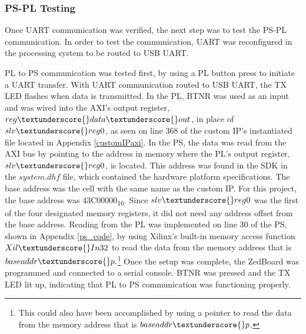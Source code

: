 \subsubsection{PS-PL Testing}
Once UART communication was verified, the next step was to test the PS-PL communication. In order to test the communication, UART was reconfigured in the processing system to be routed to USB UART.
\par
PL to PS communication was tested first, by using a PL button press to initiate a UART transfer. With UART communication routed to USB UART, the TX LED flashes when data is transmitted. In the PL, BTNR was used as an input and was wired into the AXI's output register, $reg\textunderscore{}data\textunderscore{}out$, in place of $slv\textunderscore{}reg0$, as seen on line 368 of the custom IP's instantiated file located in Appendix \ref{customIPaxi}. In the PS, the data was read from the AXI bus by pointing to the address in memory where the PL's output register, $slv\textunderscore{}reg0$, is located. This address was found in the SDK in the $system.dhf$ file, which contained the hardware platform specifications. The base address was the cell with the same name as the custom IP. For this project, the base address was 43C00000\textsubscript{16}. Since $slv\textunderscore{}reg0$ was the first of the four designated memory registers, it did not need any address offset from the base address. Reading from the PL was implemented on line 30 of the PS, shown in Appendix \ref{ps_code}, by using Xilinx's built-in memory access function $Xil\textunderscore{}In32$ to read the data from the memory address that is $baseaddr\textunderscore{}p.$\footnote{ This could also have been accomplished by using a pointer to read the data from the memory address that is $baseaddr\textunderscore{}p$.} Once the setup was complete, the ZedBoard was programmed and connected to a serial console. BTNR was pressed and the TX LED lit up, indicating that PL to PS communication was functioning properly.
\par
